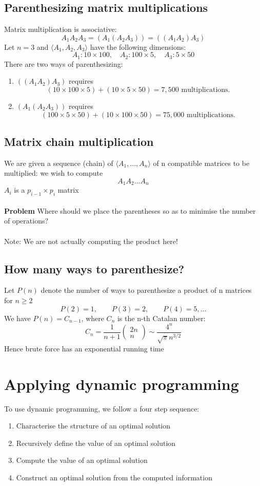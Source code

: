\documentclass{article}[18pt]
\begin{document}
\subsection{Parenthesizing matrix multiplications}
Matrix multiplication is associative:
\[
A_{1} A_{2} A_{3}=\left(A_{1}\left(A_{2} A_{3}\right)\right)=\left(\left(A_{1} A_{2}\right) A_{3}\right)
\]
Let $n=3$ and $\langle A_1, A_2, A_3 \rangle$ have the following dimensions:
\[
A_{1}: 10 \times 100, \quad A_{2}: 100 \times 5, \quad A_{3}: 5 \times 50
\]
There are two ways of parenthesizing:
\begin{enumerate}
	\item $((A_1A_2)A_3)$ requires
\[
(10 \times 100 \times 5)+(10 \times 5 \times 50)=7,500 \text { multiplications. }
\]
	\item $(A_1(A_2A_3))$ requires
\[
(100 \times 5 \times 50)+(10 \times 100 \times 50)=75,000 \text { multiplications. }
\]
\end{enumerate}
\subsection{Matrix chain multiplication}
We are given a sequence (chain) of $\langle A_1,...,A_n\rangle$ of n compatible matrices to be multiplied: we wish to compute
$$A_1A_2...A_n$$
$A_i$ is a $p_{i-1}\times p_{i}$ matrix\\
\\
\textbf{Problem} Where should we place the parentheses so as to minimise the number of operations?\\
\\
Note: We are not actually computing the product here!
\subsection{How many ways to parenthesize?}
Let $P(n)$ denote the number of ways to parenthesize a product of n matrices for $n\geqslant 2$\\
$$P(2) = 1, \qquad P(3) = 2, \qquad P(4)=5, ...$$
We have $P(n)=C_{n-1}$, where $C_n$ is the n-th Catalan number:
\[
C_{n}=\frac{1}{n+1}\left(\begin{array}{c}{2 n} \\ {n}\end{array}\right) \sim \frac{4^{n}}{\sqrt{\pi} n^{3 / 2}}
\]
Hence brute force has an exponential running time
\section{Applying dynamic programming}
To use dynamic programming, we follow a four step sequence:
\begin{enumerate}
	\item Characterise the structure of an optimal solution
	\item Recursively define the value of an optimal solution
	\item Compute the value of an optimal solution
	\item Construct an optimal solution from the computed information
\end{enumerate} 
\end{document}
